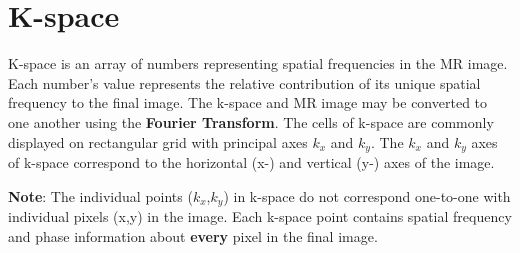 \documentclass[18pt]{extarticle}
\begin{document}
\section{K-space}
\hspace*{6mm}\large K-space is an array of numbers representing spatial frequencies in the MR image.
Each number's value represents the relative contribution of its unique spatial frequency to the final image.
The k-space and MR image may be converted to one another using the \textbf{Fourier Transform}. The cells of k-space are commonly displayed on rectangular grid with principal axes $k_x$ and $k_y$. The $k_x$ and $k_y$ axes of k-space correspond to the horizontal (x-) and vertical (y-) axes of the image.
\par
\large \textbf{Note}: The individual points ($k_x$,$k_y$) in k-space do not correspond one-to-one with individual pixels (x,y) in the image. Each k-space point contains spatial frequency and phase information about \textbf{every} pixel in the final image.
\end{document}
